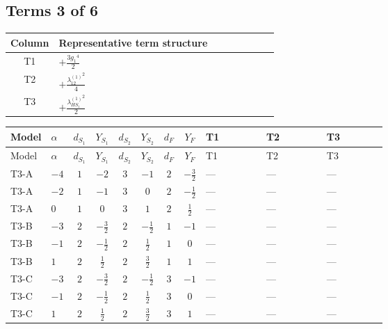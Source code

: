 \documentclass[8pt]{article}
\begin{document}
\begin{landscape}
\subsection*{Terms 3 of 6}
\begin{center}
\begin{tabular}{@{}c >{\raggedright\arraybackslash}p{0.82\linewidth}@{}}
\toprule
Column & Representative term structure \\
\midrule
T1 & \(\displaystyle +\frac{3 {g_1}^4}{2}\) \\
\midrule
T2 & \(\displaystyle +\frac{{\lambda_{12}^{(1)}}^2}{4}\) \\
\midrule
T3 & \(\displaystyle +\frac{{\lambda_{HS_1}^{(1)}}^2}{2}\) \\
\midrule
\bottomrule
\end{tabular}
\end{center}
\smallskip
\tiny
\begin{longtable}{@{}llcccccc >{\raggedright\arraybackslash}p{0.21\linewidth} >{\raggedright\arraybackslash}p{0.21\linewidth} >{\raggedright\arraybackslash}p{0.21\linewidth}@{}}
\toprule
Model & $\alpha$ & $d_{S_1}$ & $Y_{S_1}$ & $d_{S_2}$ & $Y_{S_2}$ & $d_F$ & $Y_F$ & T1 & T2 & T3 \\
\midrule
\endfirsthead
\toprule
Model & $\alpha$ & $d_{S_1}$ & $Y_{S_1}$ & $d_{S_2}$ & $Y_{S_2}$ & $d_F$ & $Y_F$ & T1 & T2 & T3 \\
\midrule
\endhead
T3-A & $-4$ & $1$ & $-2$ & $3$ & $-1$ & $2$ & $-\frac{3}{2}$ & --- & --- & --- \\
\midrule
T3-A & $-2$ & $1$ & $-1$ & $3$ & $0$ & $2$ & $-\frac{1}{2}$ & --- & --- & --- \\
\midrule
T3-A & $0$ & $1$ & $0$ & $3$ & $1$ & $2$ & $\frac{1}{2}$ & --- & --- & --- \\
\midrule
T3-B & $-3$ & $2$ & $-\frac{3}{2}$ & $2$ & $-\frac{1}{2}$ & $1$ & $-1$ & --- & --- & --- \\
\midrule
T3-B & $-1$ & $2$ & $-\frac{1}{2}$ & $2$ & $\frac{1}{2}$ & $1$ & $0$ & --- & --- & --- \\
\midrule
T3-B & $1$ & $2$ & $\frac{1}{2}$ & $2$ & $\frac{3}{2}$ & $1$ & $1$ & --- & --- & --- \\
\midrule
T3-C & $-3$ & $2$ & $-\frac{3}{2}$ & $2$ & $-\frac{1}{2}$ & $3$ & $-1$ & --- & --- & --- \\
\midrule
T3-C & $-1$ & $2$ & $-\frac{1}{2}$ & $2$ & $\frac{1}{2}$ & $3$ & $0$ & --- & --- & --- \\
\midrule
T3-C & $1$ & $2$ & $\frac{1}{2}$ & $2$ & $\frac{3}{2}$ & $3$ & $1$ & --- & --- & --- \\

\end{longtable}
\end{landscape}
\end{document}
